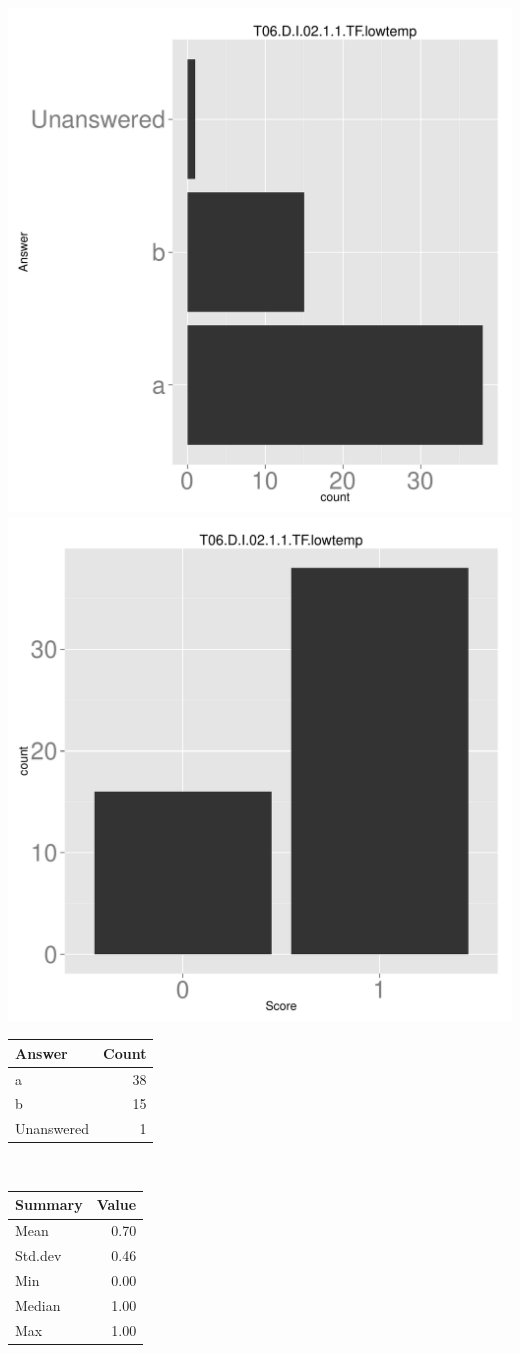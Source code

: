 \documentclass[12pt,nohyper]{tufte-handout}\usepackage[]{graphicx}\usepackage[]{color}
\begin{document}
\begin{center} \includegraphics[width=.45\linewidth]{Topic06_22_answer} \includegraphics[width=.45\linewidth]{Topic06_22_score} \end{center} 

\begin{center}%
\begin{tabular}{lr}
  \hline
Answer & Count \\ 
  \hline
a &  38 \\ 
  b &  15 \\ 
  Unanswered &   1 \\ 
   \hline
\end{tabular}
~~~~~~~~%
\begin{tabular}{lr}
  \hline
Summary & Value \\ 
  \hline
Mean & 0.70 \\ 
  Std.dev & 0.46 \\ 
  Min & 0.00 \\ 
  Median & 1.00 \\ 
  Max & 1.00 \\ 
   \hline
\end{tabular}
\end{center}\newpage{}
\end{document}
